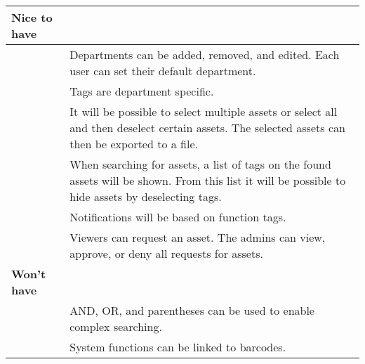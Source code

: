 \begin{table}[H]
\begin{tabular}{| m{} | p{} |}
            \textbf{Nice to have} & \\ 
            \hline
            & Departments can be added, removed, and edited. Each user can set their default department. \\ 
            \hline
            & Tags are department specific. \\ 
            \hline
            & It will be possible to select multiple assets or select all and then deselect certain assets. The selected assets can then be exported to a file. \\ 
            \hline
            & When searching for assets, a list of tags on the found assets will be shown. From this list it will be possible to hide assets by deselecting tags. \\ 
            \hline
            & Notifications will be based on function tags. \\ 
            \hline
            & Viewers can request an asset. The admins can view, approve, or deny all requests for assets. \\ 
            \hline
            \hline
            
            \textbf{Won't have} & \\ 
            \hline
            & AND, OR, and parentheses can be used to enable complex searching. \\ 
            \hline
            & System functions can be linked to barcodes. \\ 
            \hline
    \end{tabular}
\end{table}





